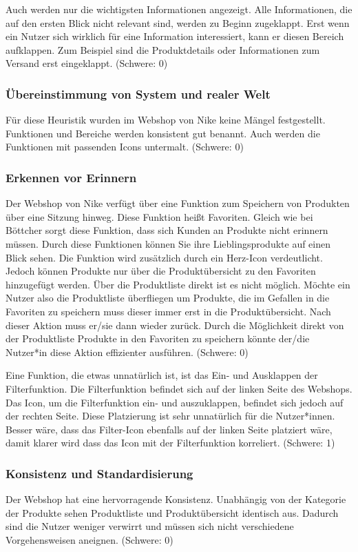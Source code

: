 \documentclass[utf8,biblatex]{lni}
\begin{document}
Auch werden nur die wichtigsten Informationen angezeigt. Alle Informationen, die auf den ersten Blick nicht relevant sind, werden zu Beginn zugeklappt. Erst wenn ein Nutzer sich wirklich für eine Information interessiert, kann er diesen Bereich aufklappen. Zum Beispiel sind die Produktdetails oder Informationen zum Versand erst eingeklappt. (Schwere: 0)


\subsubsection*{Übereinstimmung von System und realer Welt}
Für diese Heuristik wurden im Webshop von Nike keine Mängel festgestellt. Funktionen und Bereiche werden konsistent gut benannt. Auch werden die Funktionen mit passenden Icons untermalt. (Schwere: 0)


\subsubsection*{Erkennen vor Erinnern}
Der Webshop von Nike verfügt über eine Funktion zum Speichern von Produkten über eine Sitzung hinweg. Diese Funktion heißt Favoriten. Gleich wie bei Böttcher sorgt diese Funktion, dass sich Kunden an Produkte nicht erinnern müssen. Durch diese Funktionen können Sie ihre Lieblingsprodukte auf einen Blick sehen. Die Funktion wird zusätzlich durch ein Herz-Icon verdeutlicht. Jedoch können Produkte nur über die Produktübersicht zu den Favoriten hinzugefügt werden. Über die Produktliste direkt ist es nicht möglich. Möchte ein Nutzer also die Produktliste überfliegen um Produkte, die im Gefallen in die Favoriten zu speichern muss dieser immer erst in die Produktübersicht. Nach dieser Aktion muss er/sie dann wieder zurück. Durch die Möglichkeit direkt von der Produktliste Produkte in den Favoriten zu speichern könnte der/die Nutzer*in diese Aktion effizienter ausführen. (Schwere: 0)

Eine Funktion, die etwas unnatürlich ist, ist das Ein- und Ausklappen der Filterfunktion. Die Filterfunktion befindet sich auf der linken Seite des Webshops. Das Icon, um die Filterfunktion ein- und auszuklappen, befindet sich jedoch auf der rechten Seite. Diese Platzierung ist sehr unnatürlich für die Nutzer*innen. Besser wäre, dass das Filter-Icon ebenfalls auf der linken Seite platziert wäre, damit klarer wird dass das Icon mit der Filterfunktion korreliert. (Schwere: 1)


\subsubsection*{Konsistenz und Standardisierung}
Der Webshop hat eine hervorragende Konsistenz. Unabhängig von der Kategorie der Produkte sehen Produktliste und Produktübersicht identisch aus. Dadurch sind die Nutzer weniger verwirrt und müssen sich nicht verschiedene Vorgehensweisen aneignen. (Schwere: 0)
\end{document}

